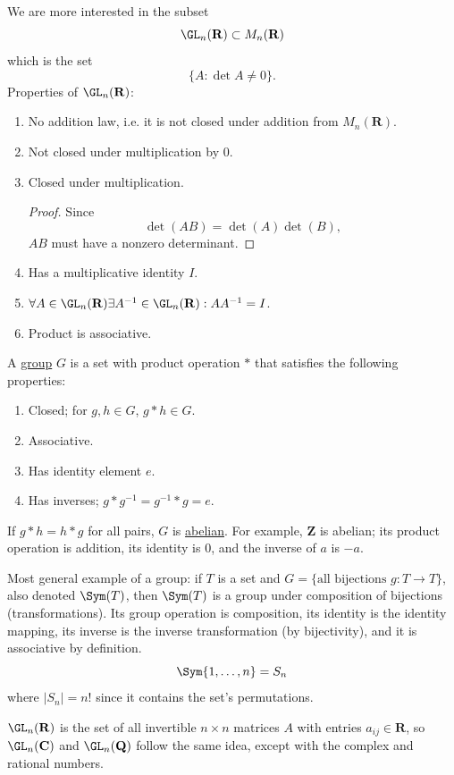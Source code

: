 \documentclass[11pt, oneside]{amsart}
\numberwithin{equation}{section}
\numberwithin{theorem}{section}
\theoremstyle{definition}
\def\Z{\mathbf{Z}}
\def\R{\mathbf{R}}
\def\Q{\mathbf{Q}}
\def\C{\mathbf{C}}
\begin{document}
We are more interested in the subset
$$
\GL_n(\R) \subset M_n(\R)
$$
which is the set
$$
\{A:\det A\neq 0\}.
$$
Properties of $\GL_n(\R)$:

\begin{enumerate}[label=(\roman*)]
	\item No addition law, i.e. it is not closed under addition from $ M_n(\R)$.
	\item Not closed under multiplication by 0.
	\item Closed under multiplication.
		\begin{proof}
			Since 
			$$
			\det(AB) = \det (A) \det (B),
			$$
			$AB$ must have a nonzero determinant.
		\end{proof}
	\item Has a multiplicative identity $I$.
	\item $\forall A \in \GL_n(\R)\exists A^{-1}\in \GL_n(\R) : AA^{-1}=I $.
	\item Product is associative.
\end{enumerate}


A \underline{group} $G$ is a set with product operation $*$ that satisfies the following properties:
\begin{enumerate}[label=(\roman*)]
	\item Closed; for $g,h\in G$, $g * h \in G$. 
	\item Associative.
	\item Has identity element $e$.
	\item Has inverses; $g*g^{-1} = g^{-1}*g = e$.
\end{enumerate} 
If $g*h=h*g$ for all pairs, $G$ is \underline{abelian}. For example, $\Z$ is abelian; its product operation is addition, its identity is $0$, and the inverse of $a$ is $-a$. 


Most general example of a group: if $T$ is a set and $G = \{\textrm{all bijections } g:T\rightarrow T\}$, also denoted $\Sym(T)$, then $\Sym(T)$ is a group under composition of bijections (transformations). Its group operation is composition, its identity is the identity mapping, its inverse is the inverse transformation (by bijectivity), and it is associative by definition. 
$$
\Sym\{1,\dots,n\} = S_n
$$ where $|S_n|=n!$ since it contains the set's permutations.


$\GL_n(\R)$ is the set of all invertible $n\times n $ matrices $A$ with entries $a_{ij}\in\R$, so $\GL_n(\C)$ and $\GL_n(\Q)$ follow the same idea, except with the complex and rational numbers. 
\end{document}
